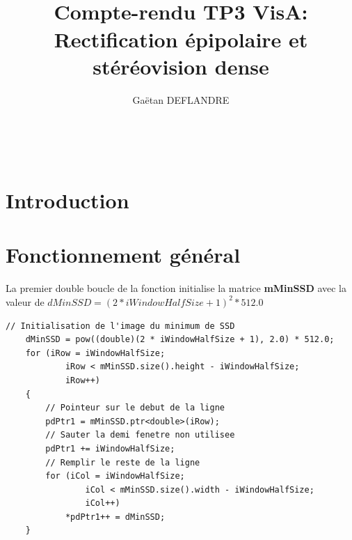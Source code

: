 \documentclass[a4paper,11pt]{article}
\title{
  \noindent\hrulefill \\
  \vspace{10mm} Compte-rendu TP3 VisA: Rectification épipolaire et stéréovision dense
}
\author{Gaëtan DEFLANDRE}
\begin{document}
\maketitle

\noindent\hrulefill \\


\section{Introduction}


\newpage

\section{Fonctionnement général}

\begin{figure}[H]
  \centering
\end{figure}

La premier double boucle de la fonction initialise la matrice
\textbf{mMinSSD} avec la valeur de $dMinSSD = (2 * iWindowHalfSize + 1)^2 * 512.0$

\begin{lstlisting}[caption=Initialisation]
    // Initialisation de l'image du minimum de SSD
    dMinSSD = pow((double)(2 * iWindowHalfSize + 1), 2.0) * 512.0;
    for (iRow = iWindowHalfSize;
            iRow < mMinSSD.size().height - iWindowHalfSize;
            iRow++)
    {
        // Pointeur sur le debut de la ligne
        pdPtr1 = mMinSSD.ptr<double>(iRow);
        // Sauter la demi fenetre non utilisee
        pdPtr1 += iWindowHalfSize;
        // Remplir le reste de la ligne
        for (iCol = iWindowHalfSize;
                iCol < mMinSSD.size().width - iWindowHalfSize;
                iCol++)
            *pdPtr1++ = dMinSSD;
    }
\end{lstlisting}
\end{document}
